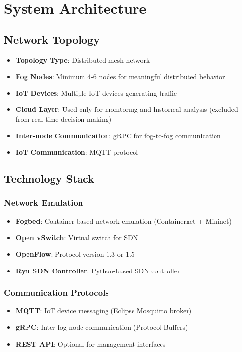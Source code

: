 \documentclass[11pt,a4paper]{article}
\begin{document}
\section{System Architecture}

\subsection{Network Topology}
\begin{itemize}
    \item \textbf{Topology Type}: Distributed mesh network
    \item \textbf{Fog Nodes}: Minimum 4-6 nodes for meaningful distributed behavior
    \item \textbf{IoT Devices}: Multiple IoT devices generating traffic
    \item \textbf{Cloud Layer}: Used only for monitoring and historical analysis (excluded from real-time decision-making)
    \item \textbf{Inter-node Communication}: gRPC for fog-to-fog communication
    \item \textbf{IoT Communication}: MQTT protocol
\end{itemize}

\subsection{Technology Stack}

\subsubsection{Network Emulation}
\begin{itemize}
    \item \textbf{Fogbed}: Container-based network emulation (Containernet + Mininet)
    \item \textbf{Open vSwitch}: Virtual switch for SDN
    \item \textbf{OpenFlow}: Protocol version 1.3 or 1.5
    \item \textbf{Ryu SDN Controller}: Python-based SDN controller
\end{itemize}

\subsubsection{Communication Protocols}
\begin{itemize}
    \item \textbf{MQTT}: IoT device messaging (Eclipse Mosquitto broker)
    \item \textbf{gRPC}: Inter-fog node communication (Protocol Buffers)
    \item \textbf{REST API}: Optional for management interfaces
\end{itemize}
\end{document}
